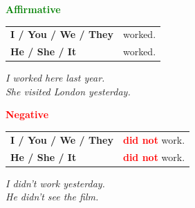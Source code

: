 \documentclass[a4paper,10pt]{article}
\newcommand{\sectiontitle}[2]{%
  {\large\bfseries\textcolor{#1}{#2}}%
}
\begin{document}
\begin{minipage}[t]{.485\textwidth}
\begin{greenbox}
  \sectiontitle{Green}{Affirmative}

  \vspace{0.75mm}
  \begin{tabular}{@{}>{\bfseries}l l@{}}
    I / You / We / They & worked.\\
    He / She / It & worked.
  \end{tabular}

  \vspace{0.75mm}
  \textit{I worked here last year.}\\[-1mm]
  \textit{She visited London yesterday.}
\end{greenbox}
\end{minipage}
\hfill
\begin{minipage}[t]{.485\textwidth}
\begin{redbox}
  \sectiontitle{Red}{Negative}

  \vspace{0.75mm}
  \begin{tabular}{@{}>{\bfseries}l l@{}}
    I / You / We / They & \textcolor{Red}{\bfseries did not} work.\\
    He / She / It & \textcolor{Red}{\bfseries did not} work.
  \end{tabular}

  \vspace{0.75mm}
  \textit{I didn't work yesterday.}\\[-1mm]
  \textit{He didn't see the film.}
\end{redbox}
\end{minipage}

\vspace{1.35mm}
\end{document}
